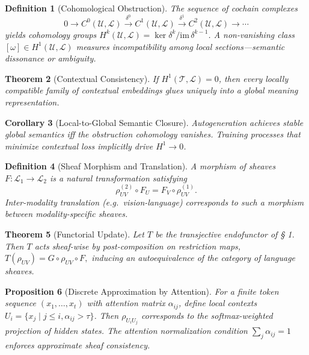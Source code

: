 \documentclass[12pt,a4paper,twoside,openright]{book}
\newtheorem{theorem}{Theorem}
\newtheorem{proposition}[theorem]{Proposition}
\newtheorem{definition}[theorem]{Definition}
\newtheorem{corollary}[theorem]{Corollary}
\begin{document}
\begin{definition}[Cohomological Obstruction]
The sequence of cochain complexes
\[
0\longrightarrow
C^0(\mathcal{U},\mathcal{L})
\xrightarrow{\delta^0}
C^1(\mathcal{U},\mathcal{L})
\xrightarrow{\delta^1}
C^2(\mathcal{U},\mathcal{L})
\longrightarrow\cdots
\]
yields cohomology groups \(H^k(\mathcal{U},\mathcal{L})=\ker\delta^k/\mathrm{im}\,\delta^{k-1}\).  
A non-vanishing class \([\omega]\in H^1(\mathcal{U},\mathcal{L})\) measures incompatibility among local sections---semantic dissonance or ambiguity.
\end{definition}

\begin{theorem}[Contextual Consistency]
\label{thm:consistency}
If \(H^1(\mathcal{T},\mathcal{L})=0\),
then every locally compatible family of contextual embeddings glues uniquely into a global meaning representation.
\end{theorem}

\begin{corollary}[Local-to-Global Semantic Closure]
Autogeneration achieves stable global semantics iff the obstruction cohomology vanishes.  
Training processes that minimize contextual loss implicitly drive \(H^1\!\to\!0\).
\end{corollary}

\begin{definition}[Sheaf Morphism and Translation]
A morphism of sheaves \(F\colon\mathcal{L}_1\to\mathcal{L}_2\) is a natural transformation satisfying
\[
\rho_{UV}^{(2)}\!\circ\!F_U
 = F_V\!\circ\!\rho_{UV}^{(1)}.
\]
Inter-modality translation (e.g.\ vision-language) corresponds to such a morphism between modality-specific sheaves.
\end{definition}

\begin{theorem}[Functorial Update]
Let \(T\) be the transjective endofunctor of § 1.  
Then \(T\) acts sheaf-wise by post-composition on restriction maps,
\(
T(\rho_{UV}) = G\!\circ\!\rho_{UV}\!\circ\!F,
\)
inducing an autoequivalence of the category of language sheaves.
\end{theorem}

\begin{proposition}[Discrete Approximation by Attention]
For a finite token sequence \((x_1,\ldots,x_t)\) with attention matrix \(\alpha_{ij}\),
define local contexts \(U_i=\{x_{j}\mid j\!\le\!i,\alpha_{ij}\!>\!\tau\}\).
Then $\rho_{U_iU_j}$ corresponds to the softmax-weighted projection of hidden states.
The attention normalization condition $\sum_j\alpha_{ij}\!=\!1$ enforces approximate sheaf consistency.
\end{proposition}
\end{document}
